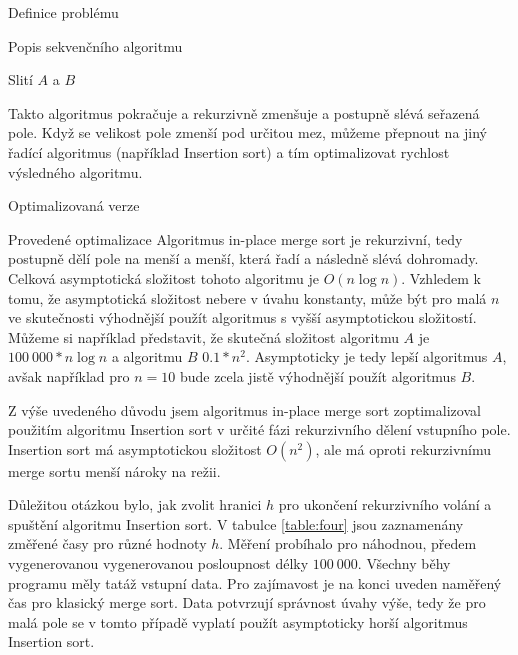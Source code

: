 \documentclass[a4paper,11pt]{article}
\begin{document}
\begin{section}{Definice problému}
\begin{subsection}{Popis sekvenčního algoritmu}
\begin{table}[ht]
\caption{Slití $A$ a $B$}
\label{table:three}
\end{table}

Takto algoritmus pokračuje a rekurzivně zmenšuje a postupně slévá seřazená pole. Když se velikost pole zmenší pod určitou
mez, můžeme přepnout na jiný řadící algoritmus (například Insertion sort) a tím optimalizovat rychlost výsledného algoritmu.
\end{subsection}
\end{section}


\begin{section}{Optimalizovaná verze}
\begin{subsection}{Provedené optimalizace}
Algoritmus in-place merge sort je rekurzivní, tedy postupně dělí pole na menší a menší, která řadí a následně slévá dohromady.
Celková asymptotická složitost tohoto algoritmu je $O(n\log{n})$. Vzhledem k tomu, že asymptotická složitost nebere v úvahu
konstanty, může být pro malá $n$ ve skutečnosti výhodnější použít algoritmus s vyšší asymptotickou složitostí. Můžeme si 
například představit, že skutečná složitost algoritmu $A$ je $100~000*n\log{n}$ a algoritmu $B$ $0.1*n^2$. 
Asymptoticky je tedy lepší algoritmus $A$, avšak například pro \(n = 10\) bude zcela jistě výhodnější použít algoritmus $B$.

Z výše uvedeného důvodu jsem algoritmus in-place merge sort zoptimalizoval použitím algoritmu Insertion sort v určité
fázi rekurzivního dělení vstupního pole. Insertion sort má asymptotickou složitost $O(n^2)$, ale má oproti rekurzivnímu
merge sortu menší nároky na režii.

Důležitou otázkou bylo, jak zvolit hranici $h$ pro ukončení rekurzivního volání a spuštění algoritmu Insertion sort.
V tabulce \ref{table:four} jsou zaznamenány změřené časy pro různé hodnoty $h$. Měření probíhalo pro náhodnou, předem vygenerovanou
vygenerovanou posloupnost délky $100~000$. Všechny běhy programu měly tatáž vstupní data. Pro zajímavost je na konci
uveden naměřený čas pro klasický merge sort. Data potvrzují správnost úvahy výše, tedy že pro malá pole se v tomto 
případě vyplatí použít asymptoticky horší algoritmus Insertion sort.



\end{subsection}
\end{section}
\end{document}
